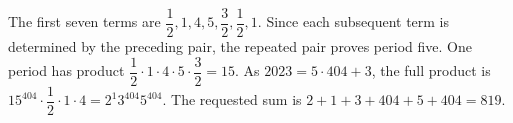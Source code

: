 The first seven terms are $\dfrac{1}{2},1,4,5,\dfrac{3}{2},\dfrac{1}{2},1$. Since each subsequent term is determined by the preceding pair, the repeated pair proves period five. One period has product $\dfrac{1}{2}\cdot1\cdot4\cdot5\cdot\dfrac{3}{2}=15$. As $2023=5\cdot404+3$, the full product is $15^{404}\cdot\dfrac{1}{2}\cdot1\cdot4=2^1 3^{404}5^{404}$. The requested sum is $2+1+3+404+5+404=\boxed{819}$.

